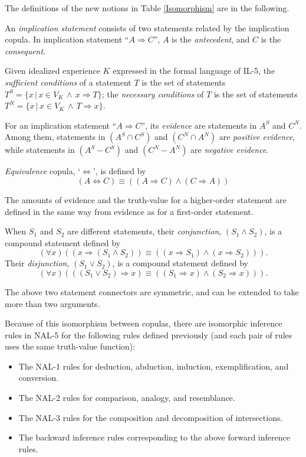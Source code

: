 The definitions of the new notions in Table \ref{Isomorphism} are in the following.

\begin{defi}
An {\em implication statement} consists of two statements related by the implication copula. In implication statement ``\(A \Rightarrow C\)'', $A$ is the {\em antecedent}, and $C$ is the {\em consequent}.
\end{defi}

\begin{defi}
Given idealized experience $K$ expressed in the formal language of IL-5, the {\em sufficient conditions} of a statement $T$ is the set of statements $T^S = \{x \, | \, x \in V_K \, \wedge \, x \Rightarrow T\}$; the {\em necessary conditions} of $T$ is the set of statements $T^N = \{x \, | \, x \in V_K \, \wedge \, T \Rightarrow x\}$.
\end{defi}
\begin{defi}
For an implication statement ``\(A \Rightarrow C\)'', its {\em evidence} are statements in $A^S$ and $C^N$.  Among them, statements in \((A^S \cap C^S)\) and \((C^N \cap A^N)\) are {\em positive evidence}, while statements in \((A^S - C^S)\) and \((C^N - A^N)\) are {\em negative evidence}.
\end{defi}

\begin{defi}
\emph{Equivalence} copula, `$\Leftrightarrow$', is defined by 
\[(A \Leftrightarrow C) \equiv ((A \Rightarrow C) \wedge (C \Rightarrow A))\]
\end{defi}

The amounts of evidence and the truth-value for a higher-order statement are defined in the same way from evidence as for a first-order statement.

\begin{defi}
When $S_1$ and $S_2$ are different statements, their {\em conjunction}, \((S_1 \wedge S_2)\), is a compound statement defined by \[(\forall x) ((x \Rightarrow (S_1 \wedge S_2)) \equiv ((x \Rightarrow S_1) \wedge (x \Rightarrow S_2))).\]  Their {\em disjunction}, \((S_1 \vee S_2)\), is a compound statement defined by \[(\forall x) (((S_1 \vee S_2) \Rightarrow x) \equiv ((S_1 \Rightarrow x) \wedge (S_2 \Rightarrow x))).\]
\end{defi}
The above two statement connectors are symmetric, and can be extended to take more than two arguments.

Because of this isomorphism between copulas, there are isomorphic inference rules in NAL-5 for the following rules defined previously (and each pair of rules uses the same truth-value function):
\begin{itemize}
	\item 
The NAL-1 rules for deduction, abduction, induction, exemplification, and conversion.
	\item 
The NAL-2 rules for comparison, analogy, and resemblance. 
	\item 
The NAL-3 rules for the composition and decomposition of intersections.
	\item
The backward inference rules corresponding to the above forward inference rules.
\end{itemize}

